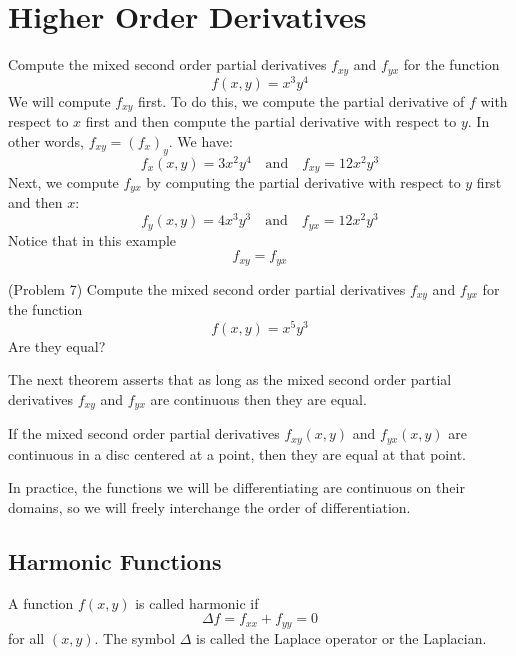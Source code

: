 \documentclass[handout]{ximera}
\begin{document}
\section{Higher Order Derivatives}

\begin{example}[Example 7]
Compute the mixed second order partial derivatives $f_{xy}$ and $f_{yx}$ for the function 
\[
f(x,y) = x^3y^4
\]
We will compute $f_{xy}$ first.  To do this, we compute the partial derivative of $f$ with respect to $x$ first and then compute the partial 
derivative with respect to $y$.  In other words, $f_{xy} = (f_x)_y$.  We have:
\[
f_x(x,y) = 3x^2y^4 \quad \text{and} \quad f_{xy} = 12x^2y^3
\]
Next, we compute $f_{yx}$ by computing the partial derivative with respect to $y$ first and then $x$:
\[
f_y(x,y) = 4x^3y^3 \quad \text{and} \quad f_{yx} = 12x^2y^3
\]
Notice that in this example
\[
f_{xy} = f_{yx}
\]
\end{example}

\begin{problem}(Problem 7)
Compute the mixed second order partial derivatives $f_{xy}$ and $f_{yx}$ for the function 
\[
f(x,y) = x^5 y^3
\]
Are they equal?
\end{problem}

The next theorem asserts that as long as the mixed second order partial derivatives $f_{xy}$ and $f_{yx}$  are continuous then they are equal.
\begin{theorem}
If the mixed second order partial derivatives $f_{xy}(x,y)$ and $f_{yx}(x,y)$ are continuous in a disc centered at a point, 
then they are equal at that point.
\end{theorem}


\begin{remark}
In practice, the functions we will be differentiating are continuous on their domains, 
so we will freely interchange the order of differentiation.
\end{remark}



\subsection{Harmonic Functions}
\begin{definition}[Harmonic]
A function $f(x,y)$ is called harmonic if 
\[
\Delta f = f_{xx} + f_{yy} = 0
\]
for all $(x,y)$. The symbol $\Delta$ is called the Laplace operator or the Laplacian.
\end{definition}
\end{document}
